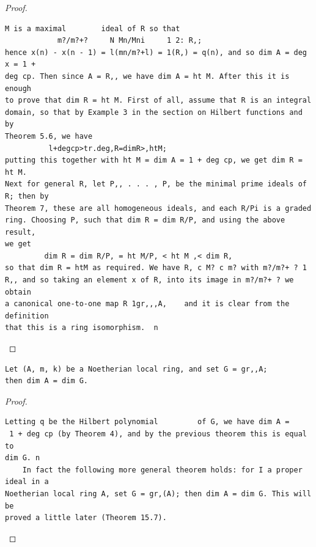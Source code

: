 \begin{proof}
\begin{verbatim}
M is a maximal        ideal of R so that
            m?/m?+?     N Mn/Mni     1 2: R,;
hence x(n) - x(n - 1) = l(mn/m?+l) = 1(R,) = q(n), and so dim A = deg x = 1 +
deg cp. Then since A = R,, we have dim A = ht M. After this it is enough
to prove that dim R = ht M. First of all, assume that R is an integral
domain, so that by Example 3 in the section on Hilbert functions and by
Theorem 5.6, we have
          l+degcp>tr.deg,R=dimR>,htM;
putting this together with ht M = dim A = 1 + deg cp, we get dim R = ht M.
Next for general R, let P,, . . . , P, be the minimal prime ideals of R; then by
Theorem 7, these are all homogeneous ideals, and each R/Pi is a graded
ring. Choosing P, such that dim R = dim R/P, and using the above result,
we get
         dim R = dim R/P, = ht M/P, < ht M ,< dim R,
so that dim R = htM as required. We have R, c M? c m? with m?/m?+ ? 1
R,, and so taking an element x of R, into its image in m?/m?+ ? we obtain
a canonical one-to-one map R 1gr,,,A,    and it is clear from the definition
that this is a ring isomorphism.  n
\end{verbatim}
\end{proof}


\begin{theorem}\label{mcrt-auto-theorem-13-9}\uses{}
\begin{verbatim}
Let (A, m, k) be a Noetherian local ring, and set G = gr,,A;
then dim A = dim G.
\end{verbatim}
\end{theorem}
\begin{proof}
\begin{verbatim}
Letting q be the Hilbert polynomial         of G, we have dim A =
 1 + deg cp (by Theorem 4), and by the previous theorem this is equal to
dim G. n
    In fact the following more general theorem holds: for I a proper ideal in a
Noetherian local ring A, set G = gr,(A); then dim A = dim G. This will be
proved a little later (Theorem 15.7).
\end{verbatim}
\end{proof}


